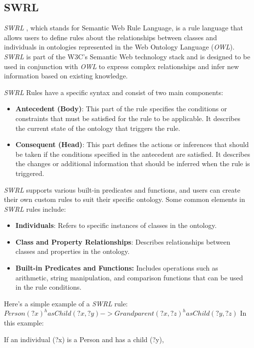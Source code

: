 	\subsection{SWRL}
	\label{sec:SWRL}
	\textit{SWRL} \cite{Horrocks2004}, which stands for Semantic Web Rule Language, is a rule language that allows users to define rules about the relationships between classes and individuals in ontologies represented in the Web Ontology Language (\textit{OWL}). \textit{SWRL} is part of the W3C's Semantic Web technology stack and is designed to be used in conjunction with \textit{OWL} to express complex relationships and infer new information based on existing knowledge.

	\textit{SWRL} Rules have a specific syntax and consist of two main components:
	\begin{itemize}
		\item \textbf{Antecedent (Body)}: This part of the rule specifies the conditions or constraints that must be satisfied for the rule to be applicable. It describes the current state of the ontology that triggers the rule.
		\item \textbf{Consequent (Head)}: This part defines the actions or inferences that should be taken if the conditions specified in the antecedent are satisfied. It describes the changes or additional information that should be inferred when the rule is triggered.
	\end{itemize}
	\textit{SWRL} supports various built-in predicates and functions, and users can create their own custom rules to suit their specific ontology. Some common elements in \textit{SWRL} rules include:
	\begin{itemize}
		\item \textbf{Individuals}: Refers to specific instances of classes in the ontology.
		\item \textbf{Class and Property Relationships}: Describes relationships between classes and properties in the ontology.
		\item \textbf{Built-in Predicates and Functions:} Includes operations such as arithmetic, string manipulation, and comparison functions that can be used in the rule conditions.
	\end{itemize}
	Here's a simple example of a \textit{SWRL} rule:
	\newline
	$Person(?x) ^ hasChild(?x, ?y) -> Grandparent(?x, ?z) ^ hasChild(?y, ?z)$
	\newline
	In this example:

	If an individual (?x) is a Person and has a child (?y),
	
